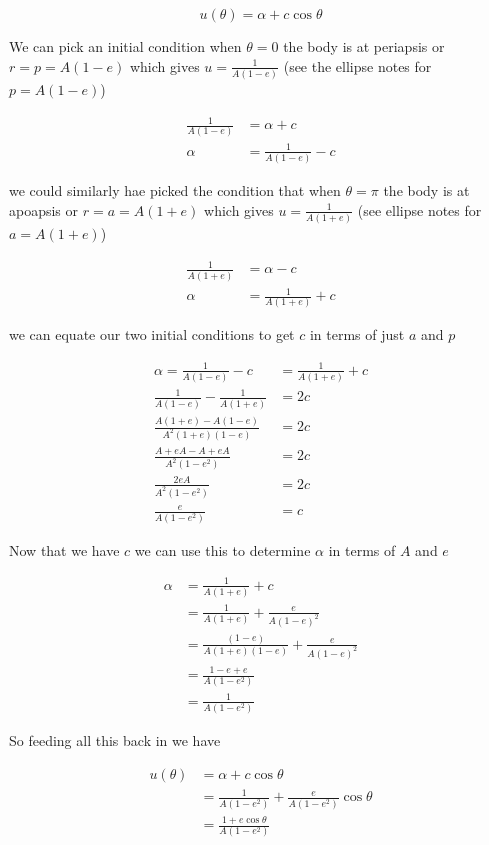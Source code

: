 \begin{equation}
u(\theta)=\alpha + c \cos \theta
\end{equation}

We can pick an initial condition when $\theta=0$ the body is at periapsis or $r=p=A(1-e)$ which gives $u=\frac{1}{A(1-e)}$ (see the ellipse notes for $p=A(1-e)$)


\begin{align}
\frac{1}{A(1-e)}&=\alpha+c \nonumber \\
\alpha&=\frac{1}{A(1-e)} - c
\end{align}


we could similarly hae picked the condition that when $\theta=\pi$ the body is at apoapsis or $r=a=A(1+e)$ which gives $u=\frac{1}{A(1+e)}$ (see ellipse notes for $a=A(1+e)$)


\begin{align}
\frac{1}{A(1+e)}&=\alpha-c \nonumber \\
\alpha&=\frac{1}{A(1+e)} + c
\end{align}

we can equate our two initial conditions to get $c$ in terms of just $a$ and $p$

\begin{align}
\alpha=\frac{1}{A(1-e)}-c&=\frac{1}{A(1+e)} + c \nonumber \\
\frac{1}{A(1-e)}-\frac{1}{A(1+e)}&=2c \nonumber \\
\frac{A(1+e)-A(1-e)}{A^2(1+e)(1-e)}&=2c \nonumber \\
\frac{A+eA-A+eA}{A^2(1-e^2)}&=2c \nonumber \\
\frac{2eA}{A^2(1-e^2)}&=2c \nonumber \\
\frac{e}{A(1-e^2)}&=c
\end{align}

Now that we have $c$ we can use this to determine $\alpha$ in terms of $A$ and $e$

\begin{align}
\alpha&=\frac{1}{A(1+e)} + c \nonumber \\
&=\frac{1}{A(1+e)} + \frac{e}{A(1-e)^2}\nonumber \\
&=\frac{(1-e)}{A(1+e)(1-e)} + \frac{e}{A(1-e)^2}\nonumber \\
&=\frac{1-e+e}{A(1-e^2)} \nonumber \\
&=\frac{1}{A(1-e^2)} \nonumber
\end{align}

So feeding all this back in we have

\begin{align}
u(\theta)&=\alpha + c \cos \theta \nonumber \\
&=\frac{1}{A(1-e^2)} + \frac{e}{A(1-e^2)} \cos \theta \nonumber \\
&=\frac{1+e\cos\theta}{A(1-e^2)}
\end{align}


